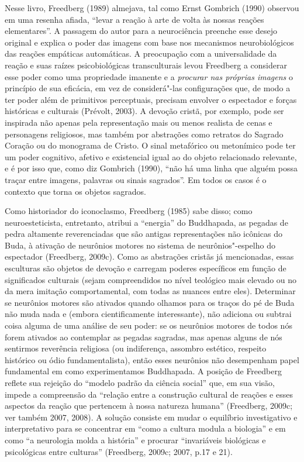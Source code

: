 Nesse livro, Freedberg (1989) almejava, tal como Ernst Gombrich (1990)
observou em uma resenha afiada, ``levar a reação à arte de volta às
nossas reações elementares''. A passagem do autor para a neurociência
preenche esse desejo original e explica o poder das imagens com base nos
mecanismos neurobiológicos das reações empáticas automáticas. A
preocupação com a universalidade da reação e suas raízes psicobiológicas
transculturais levou Freedberg a considerar esse poder como uma
propriedade imanente e a \emph{procurar nas próprias imagens} o
princípio de sua eficácia, em vez de considerá"-las configurações que, de
modo a ter poder além de primitivos perceptuais, precisam envolver o
espectador e forças históricas e culturais (Prévolt, 2003). A devoção
cristã, por exemplo, pode ser inspirada não apenas pela representação
mais ou menos realista de cenas e personagens religiosos, mas também por
abstrações como retratos do Sagrado Coração ou do monograma de Cristo. O
sinal metafórico ou metonímico pode ter um poder cognitivo, afetivo e
existencial igual ao do objeto relacionado relevante, e é por isso que,
como diz Gombrich (1990), ``não há uma linha que alguém possa traçar
entre imagens, palavras ou sinais sagrados''. Em todos os casos é o
contexto que torna os objetos sagrados.

Como historiador do iconoclasmo, Freedberg (1985) sabe disso; como
neuroesteticista, entretanto, atribui a ``energia'' do Buddhapada, as
pegadas de pedra altamente reverenciadas que são antigas representações
não icônicas do Buda, à ativação de neurônios motores no sistema de
neurônios"-espelho do espectador (Freedberg, 2009c). Como as abstrações
cristãs já mencionadas, essas esculturas são objetos de devoção e
carregam poderes específicos em função de significados culturais (sejam
compreendidos no nível teológico mais elevado ou no da mera imitação
comportamental, com todas as nuances entre eles). Determinar se
neurônios motores são ativados quando olhamos para os traços do pé de
Buda não muda nada e (embora cientificamente interessante), não adiciona
ou subtrai coisa alguma de uma análise de seu poder: se os neurônios
motores de todos nós forem ativados ao contemplar as pegadas sagradas,
mas apenas alguns de nós sentirmos reverência religiosa (ou indiferença,
assombro estético, respeito histórico ou ódio fundamentalista), então
esses neurônios não desempenham papel fundamental em como experimentamos
Buddhapada. A posição de Freedberg reflete sua rejeição do ``modelo
padrão da ciência social'' que, em sua visão, impede a compreensão da
``relação entre a construção cultural de reações e esses aspectos da
reação que pertencem à nossa natureza humana'' (Freedberg, 2009c; ver
também 2007, 2008). A solução consiste em mudar o equilíbrio
investigativo e interpretativo para se concentrar em ``como a cultura
modula a biologia'' e em como ``a neurologia molda a história'' e
procurar ``invariáveis biológicas e psicológicas entre culturas''
(Freedberg, 2009c; 2007, p.17 e 21).

